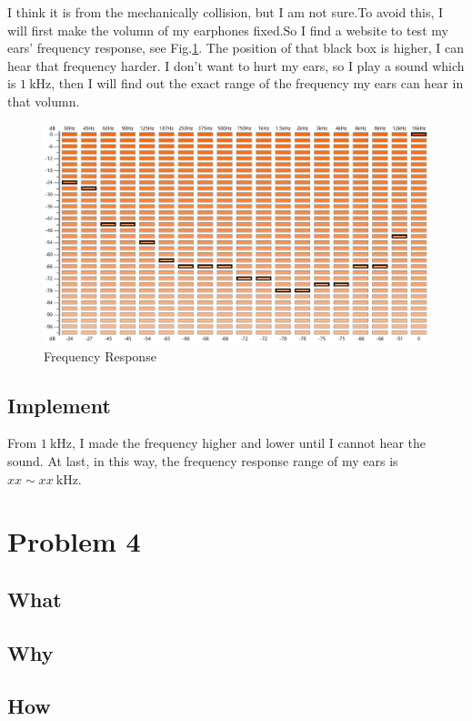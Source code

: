 \documentclass{article}
\begin{document}
I think it is from the mechanically collision, but I am not sure.To avoid this, I will first make the volumn of my earphones fixed.So I find a website\cite{HearingTest} to test my ears' frequency response, see Fig.\ref{FR}. The position of that black box is higher, I can hear that frequency harder. I don't want to hurt my ears, so I play a sound which is $1\mathrm{~kHz}$, then I will find out the exact range of the frequency my ears can hear in that volumn.

\begin{figure}[htbp]
    \centering
    \includegraphics[keepaspectratio,width=400pt]{freqReaction.jpg}
    \caption{Frequency Response}
    \label{FR}
\end{figure}

\subsection{Implement}
From $1~\mathrm{kHz}$, I made the frequency higher and lower until I cannot hear the sound.
At last, in this way, the frequency response range of my ears is $xx \sim xx ~ \mathrm{kHz}$.

\section{Problem 4}
\subsection{What}

\subsection{Why}

\subsection{How}
\end{document}
